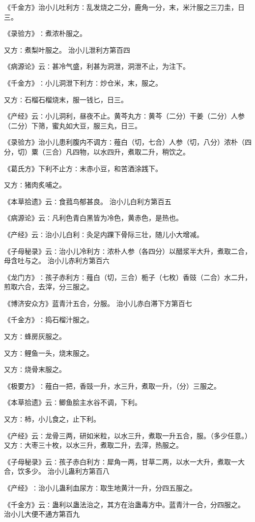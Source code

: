 \documentclass[a4paper,12pt,UTF8,twoside]{ctexbook}
\begin{document}
《千金方》治小儿吐利方∶乱发烧之二分，鹿角一分，末，米汁服之三刀圭，日三。

《录验方》∶煮浓朴服之。

又方∶煮梨叶服之。
治小儿泄利方第百四

《病源论》云∶甚冷气盛，利甚为洞泄，洞泄不止，为注下。

《千金方》∶小儿洞泄下利方∶炒仓米，末，服之。

又方∶石榴石榴烧末，服一钱匕，日三。

《产经》云∶小儿洞利，昼夜不止。黄芩丸方∶黄芩（二分）干姜（二分）人参（二分）下筛，蜜丸如大豆，服三丸，日三。

《录验方》治小儿患利腹内不调方∶薤白（切，七合）人参（切，八分）浓朴（四分，切）粟（三合）凡四物，以水四升，煮取二升，稍饮之。

《葛氏方》下利不止方∶末赤小豆，和苦酒涂践下。

又方∶猪肉炙哺之。

《本草拾遗》云∶食菰鸟郁甚良。
治小儿白利方第百五

《病源论》云∶凡利色青白黑皆为冷色，黄赤色，是热也。

《产经》云∶治小儿白利∶灸足内踝下骨际三壮，随儿小大增减。

《子母秘录》云∶治小儿冷利方∶浓朴人参（各四分）以醋浆半大升，煮取二合，母含吐与之。
治小儿赤利方第百六

《龙门方》∶孩子赤利方∶薤白（切，三合）栀子（七枚）香豉（二合）水二升，煎取六合，去滓，分三服之。

《博济安众方》蓝青汁五合，分服。
治小儿赤白滞下方第百七

《千金方》∶捣石榴汁服之。

又方∶蜂房灰服之。

又方∶鲤鱼一头，烧末服之。

又方∶烧骨末服之。

《极要方》∶薤白一把，香豉一升，水三升，煮取一升，（分）三服之。

《本草拾遗》云∶鲫鱼脍主水谷不调，下利。

又方∶柿，小儿食之，止下利。

《产经》云∶龙骨三两，研如米粒，以水三升，煮取一升五合，服。（多少任意。）又方∶大枣三十枚，以水三升，煮取二升，去滓，热服之。

《子母秘录》云∶孩子赤白利方∶犀角一两，甘草二两，以水一大升，煮取一大合，饮多少。
治小儿蛊利方第百八

《产经》∶治小儿蛊利血尿方∶取生地黄汁一升，分四五服之。

《千金方》云∶蛊利以蛊法治之，其方在治蛊毒方中。蓝青汁一合，分四服之。
治小儿大便不通方第百九
\end{document}
